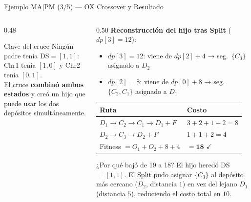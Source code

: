 \documentclass[aspectratio=169,10pt]{beamer}
\begin{document}
\begin{frame}{Ejemplo MA$|$PM (3/5) --- OX Crossover y Resultado}
\begin{columns}[T,onlytextwidth]
\begin{column}{0.48\textwidth}
      \vspace{0.5em}
      \begin{alertblock}{Clave del cruce}\small
        Ningún padre tenía DS$=[1,1]$:\\
        Chr1 tenía $[1,0]$ y Chr2 tenía $[0,1]$.\\[0.3em]
        El cruce \textbf{combinó ambos estados} y creó un hijo que puede usar los dos depósitos simultáneamente.
      \end{alertblock}
    \end{column}
    \begin{column}{0.50\textwidth}
      \textbf{Reconstrucción del hijo tras Split} ($dp[3]{=}12$):
      \vspace{0.2em}
      \begin{itemize}\small
        \item $dp[3]{=}12$: viene de $dp[2]{+}4$ → seg.\ $\{C_3\}$ asignado a $D_2$
        \item $dp[2]{=}8$: viene de $dp[0]{+}8$ → seg.\ $\{C_2,C_1\}$ asignado a $D_1$
      \end{itemize}
      \vspace{0.3em}
      \begin{center}\small
      \begin{tabular}{ll}
        \toprule
        Ruta & Costo \\
        \midrule
        $D_1\!\to\!C_2\!\to\!C_1\!\to\!D_1{+}F$ & $3{+}2{+}1{+}2=8$ \\
        $D_2\!\to\!C_3\!\to\!D_2{+}F$            & $1{+}1{+}2=4$ \\
        \midrule
        Fitness $= O_1{+}O_2{+}8{+}4$ & $= \mathbf{18}$ $\checkmark$ \\
        \bottomrule
      \end{tabular}
      \end{center}
      \vspace{0.3em}
      \begin{block}{¿Por qué bajó de 19 a 18?}\small
        El hijo heredó DS$=[1,1]$. El Split pudo asignar $\{C_3\}$ al depósito más cercano ($D_2$, distancia $1$) en vez del lejano $D_1$ (distancia $5$), reduciendo el costo total en $10$.
      \end{block}
    \end{column}
  \end{columns}
\end{frame}
\end{document}
